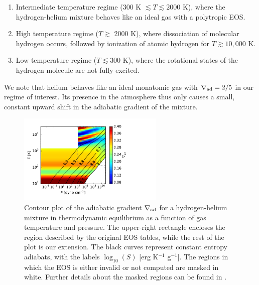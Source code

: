 \begin{enumerate}
\item Intermediate temperature regime (300 K $\lesssim T \lesssim 2000$ K), where the hydrogen-helium mixture behaves like an ideal gas with a polytropic EOS.
\item High temperature regime ($T \gtrsim$ 2000 K), where dissociation of molecular hydrogen occurs, followed by ionization of atomic hydrogen for $T \gtrsim 10,000$ K.
\item Low temperature regime ($T \lesssim 300$ K), where the rotational states of the hydrogen molecule are not fully excited. %
\end{enumerate}

We note that helium behaves like an ideal monatomic gas with $\nabla_{\rm ad}=2/5$ in our regime of interest.  Its presence in the atmosphere thus only causes a small, constant upward shift in the adiabatic gradient of the mixture.

\begin{figure}[h]
\centering
\includegraphics[width=0.62\textwidth]{figures/delad_S_mixt.pdf}
\caption{Contour plot of the adiabatic gradient $\nabla_{\rm ad}$ for a hydrogen-helium mixture in thermodynamic equilibrium as a function of gas temperature and pressure. The upper-right rectangle encloses the region described by the original \citet{saumon95} EOS tables, while the rest of the plot is our extension. The black curves represent constant entropy adiabats, with the labels $\log_{10}(S)$ [erg K$^{-1}$ g$^{-1}$]. The regions in which the EOS is either invalid or not computed are masked in white. Further details about the masked regions can be found in .}
\label{fig:deladmap}
\end{figure}

